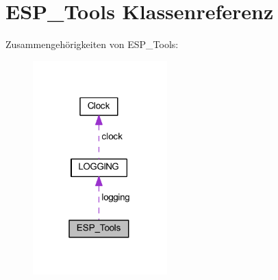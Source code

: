 \hypertarget{class_e_s_p___tools}{}\section{E\+S\+P\+\_\+\+Tools Klassenreferenz}
\label{class_e_s_p___tools}


Zusammengehörigkeiten von E\+S\+P\+\_\+\+Tools\+:
\nopagebreak
\begin{figure}[H]
\begin{center}
\leavevmode
\includegraphics[width=147pt]{class_e_s_p___tools__coll__graph}
\end{center}
\end{figure}
